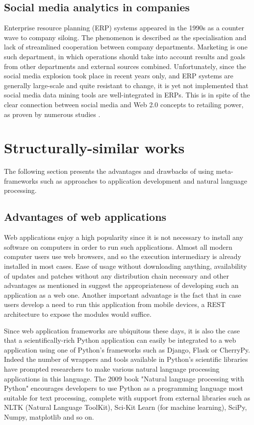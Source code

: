 \subsection{Social media analytics in companies}
Enterprise resource planning (ERP) systems appeared in the 1990s as a counter wave to company siloing. The phenomenon is described as the specialisation and lack of streamlined cooperation between company departments. Marketing is one such department, in which operations should take into account results and goals from other departments and external sources combined. Unfortunately, since the social media explosion took place in recent years only, and ERP systems are generally large-scale and quite resistant to change, it is yet not implemented that social media data mining tools are well-integrated in ERPs. This is in spite of the clear connection between social media and Web 2.0 concepts to retailing power, as proven by numerous studies \cite{constantinides2008social}.

\section{Structurally-similar works}
The following section presents the advantages and drawbacks of using meta-frameworks such as approaches to application development and natural language processing.

\subsection{Advantages of web applications}
Web applications enjoy a high popularity since it is not necessary to install any software on computers in order to run such applications. Almost all modern computer users use web browsers, and so the execution intermediary is already installed in most cases. Ease of usage without downloading anything, availability of updates and patches without any distribution chain necessary and other advantages as mentioned in \cite{tung2013internet} suggest the appropriateness of developing such an application as a web one. Another important advantage is the fact that in case users develop a need to run this application from mobile devices, a REST architecture to expose the modules would suffice.

Since web application frameworks are ubiquitous these days, it is also the case that a scientifically-rich Python application can easily be integrated to a web application using one of Python's frameworks such as Django, Flask or CherryPy. Indeed the number of wrappers and tools available in Python's scientific libraries have prompted researchers to make various natural language processing applications in this language. The 2009 book "Natural language processing with Python" \cite{bird2009natural} encourages developers to use Python as a programming language most suitable for text processing, complete with support from external libraries such as NLTK (Natural Language ToolKit), Sci-Kit Learn (for machine learning), SciPy, Numpy, matplotlib and so on.

